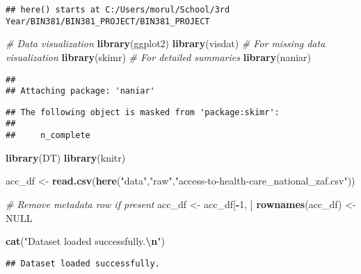 \documentclass[
]{article}
\newenvironment{Shaded}{\begin{snugshade}}{\end{snugshade}}
\newcommand{\CommentTok}[1]{\textcolor[rgb]{0.56,0.35,0.01}{\textit{#1}}}
\newcommand{\ConstantTok}[1]{\textcolor[rgb]{0.56,0.35,0.01}{#1}}
\newcommand{\DecValTok}[1]{\textcolor[rgb]{0.00,0.00,0.81}{#1}}
\newcommand{\FunctionTok}[1]{\textcolor[rgb]{0.13,0.29,0.53}{\textbf{#1}}}
\newcommand{\NormalTok}[1]{#1}
\newcommand{\OtherTok}[1]{\textcolor[rgb]{0.56,0.35,0.01}{#1}}
\newcommand{\SpecialCharTok}[1]{\textcolor[rgb]{0.81,0.36,0.00}{\textbf{#1}}}
\newcommand{\StringTok}[1]{\textcolor[rgb]{0.31,0.60,0.02}{#1}}
\begin{document}
\begin{verbatim}
## here() starts at C:/Users/morul/School/3rd Year/BIN381/BIN381_PROJECT/BIN381_PROJECT
\end{verbatim}

\begin{Shaded}
\begin{Highlighting}[]
\CommentTok{\# Data visualization}
\FunctionTok{library}\NormalTok{(ggplot2)}
\FunctionTok{library}\NormalTok{(visdat) }\CommentTok{\# For missing data visualization}
\FunctionTok{library}\NormalTok{(skimr)  }\CommentTok{\# For detailed summaries}
\FunctionTok{library}\NormalTok{(naniar)}
\end{Highlighting}
\end{Shaded}

\begin{verbatim}
## 
## Attaching package: 'naniar'
\end{verbatim}

\begin{verbatim}
## The following object is masked from 'package:skimr':
## 
##     n_complete
\end{verbatim}

\begin{Shaded}
\begin{Highlighting}[]
\FunctionTok{library}\NormalTok{(DT)}
\FunctionTok{library}\NormalTok{(knitr)}
\end{Highlighting}
\end{Shaded}

\begin{Shaded}
\begin{Highlighting}[]
\NormalTok{acc\_df }\OtherTok{\textless{}{-}} \FunctionTok{read.csv}\NormalTok{(}\FunctionTok{here}\NormalTok{(}\StringTok{"data"}\NormalTok{,}\StringTok{"raw"}\NormalTok{,}\StringTok{"access{-}to{-}health{-}care\_national\_zaf.csv"}\NormalTok{))}

\CommentTok{\# Remove metadata row if present}
\NormalTok{acc\_df }\OtherTok{\textless{}{-}}\NormalTok{ acc\_df[}\SpecialCharTok{{-}}\DecValTok{1}\NormalTok{, ]}
\FunctionTok{rownames}\NormalTok{(acc\_df) }\OtherTok{\textless{}{-}} \ConstantTok{NULL}

\FunctionTok{cat}\NormalTok{(}\StringTok{"Dataset loaded successfully.}\SpecialCharTok{\textbackslash{}n}\StringTok{"}\NormalTok{)}
\end{Highlighting}
\end{Shaded}

\begin{verbatim}
## Dataset loaded successfully.
\end{verbatim}
\end{document}

